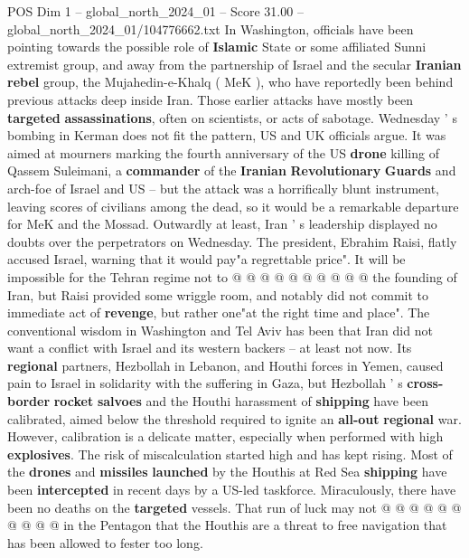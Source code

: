 \begin{textsample}{POS Dim 1 – global\_north\_2024\_01 – Score 31.00 – global\_north\_2024\_01/104776662.txt}  \label{ex:f1_pos_121}
In Washington, officials have been pointing towards the possible role of \textbf{Islamic} State or some affiliated Sunni extremist group, and away from the partnership of Israel and the secular \textbf{Iranian} \textbf{rebel} group, the Mujahedin-e-Khalq ( MeK ), who have reportedly been behind previous attacks deep inside Iran.
Those earlier attacks have mostly been \textbf{targeted} \textbf{assassinations}, often on scientists, or acts of sabotage.
Wednesday ' s bombing in Kerman does not fit the pattern, US and UK officials argue.
It was aimed at mourners marking the fourth anniversary of the US \textbf{drone} killing of Qassem Suleimani, a \textbf{commander} of the \textbf{Iranian} \textbf{Revolutionary} \textbf{Guards} and arch-foe of Israel and US -- but the attack was a horrifically blunt instrument, leaving scores of civilians among the dead, so it would be a remarkable departure for MeK and the Mossad.
Outwardly at least, Iran ' s leadership displayed no doubts over the perpetrators on Wednesday.
The president, Ebrahim Raisi, flatly accused Israel, warning that it would pay"a regrettable price".
It will be impossible for the Tehran regime not to @ @ @ @ @ @ @ @ @ @ the founding of Iran, but Raisi provided some wriggle room, and notably did not commit to immediate act of \textbf{revenge}, but rather one"at the right time and place".
The conventional wisdom in Washington and Tel Aviv has been that Iran did not want a conflict with Israel and its western backers -- at least not now.
Its \textbf{regional} partners, Hezbollah in Lebanon, and Houthi forces in Yemen, caused pain to Israel in solidarity with the suffering in Gaza, but Hezbollah ' s \textbf{cross-border} \textbf{rocket} \textbf{salvoes} and the Houthi harassment of \textbf{shipping} have been calibrated, aimed below the threshold required to ignite an \textbf{all-out} \textbf{regional} war.
However, calibration is a delicate matter, especially when performed with high \textbf{explosives}.
The risk of miscalculation started high and has kept rising.
Most of the \textbf{drones} and \textbf{missiles} \textbf{launched} by the Houthis at Red Sea \textbf{shipping} have been \textbf{intercepted} in recent days by a US-led taskforce.
Miraculously, there have been no deaths on the \textbf{targeted} vessels.
That run of luck may not @ @ @ @ @ @ @ @ @ @ in the Pentagon that the Houthis are a threat to free navigation that has been allowed to fester too long.

\end{textsample}
